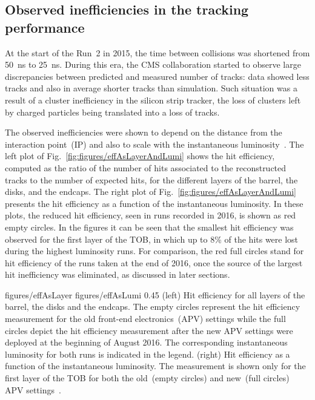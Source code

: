\subsection{Observed inefficiencies in the tracking performance}

At the start of the Run~2 in 2015, the time between collisions was shortened from 50~ns to 25~ns. During this era, the CMS collaboration started to observe large discrepancies between predicted and measured number of tracks: data showed less tracks and also in average shorter tracks than simulation. Such situation was a result of a cluster inefficiency in the silicon strip tracker, the loss of clusters left by charged particles being translated into a loss of tracks. 

The observed inefficiencies were shown to depend on the distance from the interaction point~(IP) and also to scale with the instantaneous luminosity~\cite{website:hitEff}. The left plot of Fig.~\ref{fig:figures/effAsLayerAndLumi} shows the hit efficiency, computed as the ratio of the number of hits associated to the reconstructed tracks to the number of expected hits, for the different layers of the barrel, the disks, and the endcaps. The right plot of Fig.~\ref{fig:figures/effAsLayerAndLumi} presents the hit efficiency as a function of the instantaneous luminosity. In these plots, the reduced hit efficiency, seen in runs recorded in 2016, is shown as red empty circles. In the figures it can be seen that the smallest hit efficiency was observed for the first layer of the TOB, in which up to 8\% of the hits were lost during the highest luminosity runs. For comparison, the red full circles stand for hit efficiency of the runs taken at the end of 2016, once the source of the largest hit inefficiency was eliminated, as discussed in later sections.


                 {figures/effAsLayer}
                 {figures/effAsLumi} %
                 {0.45}       %
                 {(left) Hit efficiency for all layers of the barrel, the disks and the endcaps. The empty circles represent the hit efficiency measurement for the old front-end electronics~(APV) settings while the full circles depict the hit efficiency measurement after the new APV settings were deployed at the beginning of August 2016. The corresponding instantaneous luminosity for both runs is indicated in the legend. (right) Hit efficiency as a function of the instantaneous luminosity. The measurement is shown only for the first layer of the TOB for both the old~(empty circles) and new~(full circles) APV settings~\cite{website:hitEff}. } %


